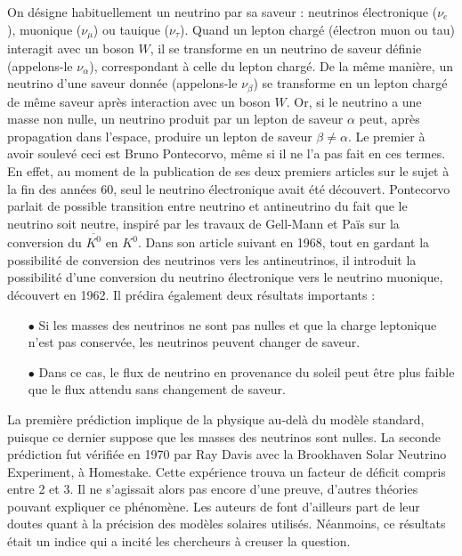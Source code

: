       On désigne habituellement un neutrino par sa saveur : neutrinos électronique ($\nu_e$), muonique ($\nu_{\mu}$) ou tauique ($\nu_{\tau}$). Quand un lepton chargé (électron muon ou tau) interagit avec un boson $W$, il se transforme en un neutrino de saveur définie (appelons-le $\nu_{\alpha}$), correspondant à celle du lepton chargé. De la même manière, un neutrino d'une saveur donnée (appelons-le $\nu_{\beta}$) se transforme en un lepton chargé de même saveur après interaction avec un boson $W$. Or, si le neutrino a une masse non nulle, un neutrino produit par un lepton de saveur $\alpha$ peut, après propagation dans l'espace, produire un lepton de saveur $\beta\ne\alpha$. Le premier à avoir soulevé ceci est Bruno Pontecorvo, même si il ne l'a pas fait en ces termes. En effet, au moment de la publication de ses deux premiers articles\cite{Pontecorvo:1957cp,Pontecorvo:1957qd} sur le sujet à la fin des années 60, seul le neutrino électronique avait été découvert. Pontecorvo parlait de possible transition entre neutrino et antineutrino du fait que le neutrino soit neutre, inspiré par les travaux de Gell-Mann et Païs\cite{Gell-Mann1955} sur la conversion du $\overline{K^0}$ en  $K^0$. Dans son article suivant en 1968\cite{Pontecorvo1968}, tout en gardant la possibilité de conversion des neutrinos vers les antineutrinos, il introduit la possibilité d'une conversion du neutrino électronique vers le neutrino muonique, découvert en 1962\cite{Danby1962}. Il prédira également deux résultats importants :
      \begin{itemize}
        \item[$\bullet$] Si les masses des neutrinos ne sont pas nulles et que la charge leptonique n'est pas conservée, les neutrinos peuvent changer de saveur.
        \item[$\bullet$] Dans ce cas, le flux de neutrino en provenance du soleil peut être plus faible que le flux attendu sans changement de saveur.
      \end{itemize}
      La première prédiction implique de la physique au-delà du modèle standard, puisque ce dernier suppose que les masses des neutrinos sont nulles. La seconde prédiction fut vérifiée en 1970 par Ray Davis avec la Brookhaven Solar Neutrino Experiment\cite{Bahcall1976}, à Homestake. Cette expérience trouva un facteur de déficit compris entre 2 et 3. Il ne s'agissait alors pas encore d'une preuve, d'autres théories pouvant expliquer ce phénomène. Les auteurs de \cite{Bahcall1976} font d'ailleurs part de leur doutes quant à la précision des modèles solaires utilisés. Néanmoins, ce résultats était un indice qui a incité les chercheurs à creuser la question.

